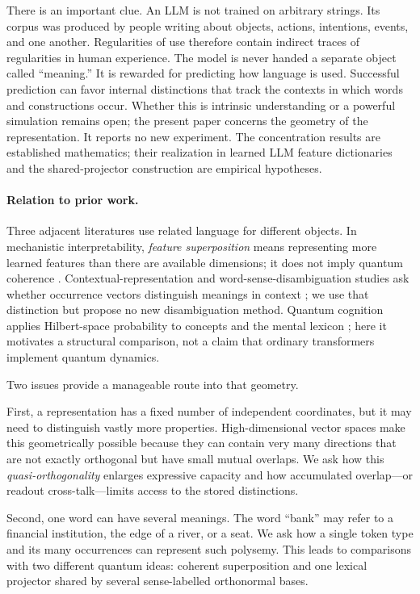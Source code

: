 \documentclass[
  aps,
  reprint,
  superscriptaddress,
  floatfix,
  nofootinbib,
  longbibliography
]{revtex4-2}
\begin{document}
There is an important clue.  An LLM is not trained on arbitrary strings.
Its corpus was produced by people writing about objects, actions, intentions,
events, and one another.  Regularities of use therefore contain indirect
traces of regularities in human experience.  The model is never handed a
separate object called ``meaning.''  It is rewarded for predicting how
language is used.  Successful prediction can favor internal distinctions that
track the contexts in which words and constructions occur.  Whether this is
intrinsic understanding or a powerful simulation remains open; the present
paper concerns the geometry of the representation.  It reports no new
experiment.  The concentration results are established mathematics; their
realization in learned LLM feature dictionaries and the shared-projector
construction are empirical hypotheses.

\paragraph*{Relation to prior work.}
Three adjacent literatures use related language for different objects.  In
mechanistic interpretability, \emph{feature superposition} means representing
more learned features than there are available dimensions; it does not imply
quantum coherence \cite{elhage2022superposition}.  Contextual-representation
and word-sense-disambiguation studies ask whether occurrence vectors
distinguish meanings in context
\cite{ethayarajh2019,pilehvar2019wic,wiedemann2019does,scarlini2020ares}; we
use that distinction but propose no new disambiguation method.  Quantum
cognition applies Hilbert-space probability to concepts and the mental lexicon
\cite{bruza2009lexicon,Busemeyer2012}; here it motivates a structural
comparison, not a claim that ordinary transformers implement quantum dynamics.

Two issues provide a manageable route into that geometry.

First, a representation has a fixed number of independent coordinates, but it
may need to distinguish vastly more properties.  High-dimensional vector
spaces make this geometrically possible because they can contain very many directions that
are not exactly orthogonal but have small mutual overlaps.  We ask how this
\emph{quasi-orthogonality} enlarges expressive capacity and how accumulated
overlap---or readout cross-talk---limits access to the stored distinctions.

Second, one word can have several meanings.  The word ``bank'' may refer to a
financial institution, the edge of a river, or a seat.  We ask how a single
token type and its many occurrences can represent such polysemy.  This leads
to comparisons with two different quantum ideas: coherent superposition and
one lexical projector shared by several sense-labelled orthonormal bases.
\end{document}
